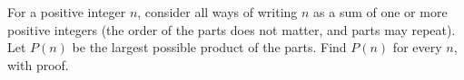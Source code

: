 For a positive integer $n$, consider all ways of writing $n$ as a sum of one or more positive integers (the order of the parts does not matter, and parts may repeat). Let $P(n)$ be the largest possible product of the parts. Find $P(n)$ for every $n$, with proof.
